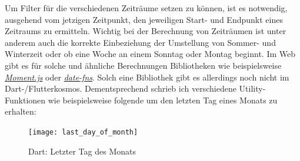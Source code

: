 Um Filter für die verschiedenen Zeiträume setzen zu können,
ist es notwendig, ausgehend vom jetzigen Zeitpunkt,
den jeweiligen Start- und Endpunkt eines Zeitraums zu ermitteln.
Wichtig bei der Berechnung von Zeiträumen ist unter anderem auch
die korrekte Einbeziehung der Umstellung von Sommer- und Winterzeit
oder ob eine Woche an einem Sonntag oder Montag beginnt.
Im Web gibt es für solche und ähnliche Berechnungen Bibliotheken
wie beispielsweise \href{https://momentjs.com/docs/}{\textit{Moment.js}}
oder \href{https://date-fns.org/}{\textit{date-fns}}.
Solch eine Bibliothek gibt es allerdings noch nicht im Dart-/Flutterkosmos.
Dementsprechend schrieb ich verschiedene Utility-Funktionen wie
beispielsweise folgende um den letzten Tag eines Monats zu erhalten:
\begin{figure}[H]
    \centering
    \texttt{[image: last\_day\_of\_month]}
    \caption{Dart: Letzter Tag des Monats}
\end{figure}

